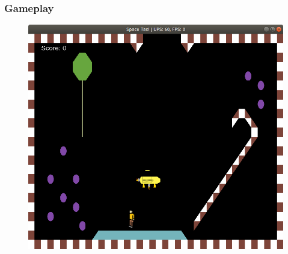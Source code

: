 \begin{frame}
    \frametitle{Gameplay}
    \begin{figure}
      \begin{center}
        \includegraphics[height=0.7\textheight]{GamePlay.png}
      \end{center}
    \end{figure}
\end{frame}
